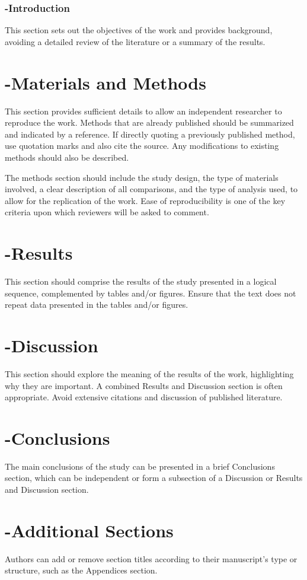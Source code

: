 \documentclass[letterpaper]{EmergentUDB}
\begin{document}
\section*{-Introduction}
This section sets out the objectives of the work and provides background, avoiding a detailed review of the literature or a summary of the results.

\part{-Materials and Methods}
This section provides sufficient details to allow an independent researcher to reproduce the work. Methods that are already published should be summarized and indicated by a reference. If directly quoting a previously published method, use quotation marks and also cite the source. Any modifications to existing methods should also be described.

The methods section should include the study design, the type of materials involved, a clear description of all comparisons, and the type of analysis used, to allow for the replication of the work. Ease of reproducibility is one of the key criteria upon which reviewers will be asked to comment.

\part{-Results}
This section should comprise the results of the study presented in a logical sequence, complemented by tables and/or figures. Ensure that the text does not repeat data presented in the tables and/or figures.

\part{-Discussion}
This section should explore the meaning of the results of the work, highlighting why they are important. A combined Results and Discussion section is often appropriate. Avoid extensive citations and discussion of published literature.

\part{-Conclusions}
The main conclusions of the study can be presented in a brief Conclusions section, which can be independent or form a subsection of a Discussion or Results and Discussion section.

\part{-Additional Sections}
Authors can add or remove section titles according to their manuscript's type or structure, such as the Appendices section.
\end{document}
